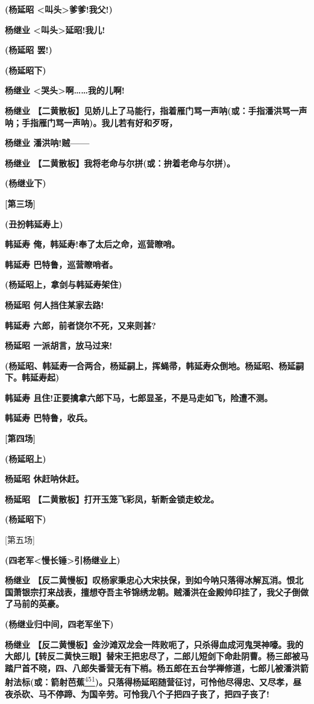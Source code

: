 \textbf{(杨延昭 \textless{}叫头\textgreater{}爹爹!我父!)}

\textbf{杨继业 \textless{}叫头\textgreater{}延昭!我儿!}

\textbf{(杨延昭 罢!)}

\textbf{(杨延昭下)}

\textbf{杨继业 \textless{}哭头\textgreater{}啊\ldots{}\ldots{}我的儿啊!}

\textbf{杨继业
【二黄散板】见娇儿上了马能行，指着雁门骂一声呐(或：手指潘洪骂一声呐；手指雁门骂一声呐)。我儿若有好和歹呀，}

\textbf{杨继业 潘洪呐!贼------}

\textbf{杨继业 【二黄散板】我将老命与尔拼(或：拚着老命与尔拼)。}

\textbf{(杨继业下)}

\textbf{{[}第三场{]}}

\textbf{(丑扮韩延寿上)}

\textbf{韩延寿 俺，韩延寿!奉了太后之命，巡营瞭哨。}

\textbf{韩延寿 巴特鲁，巡营瞭哨者。}

\textbf{(杨延昭上，拿剑与韩延寿架住)}

\textbf{杨延昭 何人挡住某家去路!}

\textbf{韩延寿 六郎，前者饶尔不死，又来则甚?}

\textbf{杨延昭 一派胡言，放马过来!}

\textbf{(杨延昭、韩延寿一合两合，杨延嗣上，挥蝇帚，韩延寿众倒地。杨延昭、杨延嗣下。韩延寿起)}

\textbf{韩延寿
且住!正要擒拿六郎下马，七郎显圣，不是马走如飞，险遭不测。}

\textbf{韩延寿 巴特鲁，收兵。}

\textbf{{[}第四场{]}}

\textbf{(杨延昭上)}

\textbf{杨延昭 休赶呐休赶。}

\textbf{杨延昭 【二黄散板】打开玉笼飞彩凤，斩断金锁走蛟龙。}

\textbf{(杨延昭下)}

{[}第五场{]}

\textbf{(四老军\textless{}慢长锤\textgreater{}引杨继业上)}

\textbf{杨继业
【反二黄慢板】叹杨家秉忠心大宋扶保，到如今呐只落得冰解瓦消。恨北国萧银宗打来战表，擅想夺吾主爷锦绣龙朝。贼潘洪在金殿帅印挂了，我父子倒做了马前的英豪。}

\textbf{(杨继业归中间，四老军坐下)}

\textbf{杨继业
【反二黄慢板】金沙滩双龙会一阵败呃了，只杀得血成河鬼哭神嚎。我的大郎儿【转反二黄快三眼】替宋王把忠尽了，二郎儿短剑下命赴阴曹。杨三郎被马踏尸首不晓，四、八郎失番营无有下梢。杨五郎在五台学禅修道，七郎儿被潘洪箭射法标(或：箭射芭蕉}\protect\hyperlink{fn451}{\textsuperscript{451}}\textbf{)。只落得杨延昭随营征讨，可怜他尽得忠、又尽孝，昼夜杀砍、马不停蹄、为国辛劳。可怜我八个子把四子丧了，把四子丧了!}

